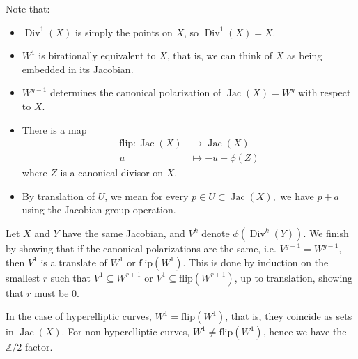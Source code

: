 \documentclass[12pt,reqno]{amsart}
\DeclareMathOperator{\Jac}{Jac}
\DeclareMathOperator{\Div}{Div}
\newcommand{\Z}{\mathbb{Z}}
\theoremstyle{definition}
\theoremstyle{remark}
\newcommand{\ti}{\todo[inline]}
\begin{document}

Note that: 

\begin{itemize} 
\item $\Div^1(X)$ is simply the points on $X$, so  $\Div^1(X) = X$.

\item $W^1$ is birationally equivalent to $X$, that is, we can think of $X$ as being embedded in its Jacobian. 

\item  $W^{g-1}$ determines the canonical polarization of $\Jac(X) = W^g$ with respect to $X$.  

\item There is a map \begin{align*}
\text{flip}: \Jac(X) &\to \Jac(X)\\
u &\mapsto -u + \phi(Z)
\end{align*}
where $Z$ is a canonical divisor on $X$.
\item By translation of $U$, we mean for every $p \in U \subset \Jac(X),$ we have $p+a$ using the Jacobian group operation.
\end{itemize} 

Let $X$ and $Y$ have the same Jacobian, and $V^{k}$ denote $\phi(\Div^k(Y))$. We finish by showing that if the canonical polarizations are the same, i.e. $V^{g-1} = W^{g-1}$, then $V^1$ is a translate of $W^1$ or $\text{flip}(W^1)$. This is done by induction on the smallest $r$ such that $V^1 \subseteq W^{r+1}$ or $V^1 \subseteq \text{flip}(W^{r+1})$, up to translation, showing that $r$ must be 0.


 In the case of hyperelliptic curves, $W^1 = \text{flip}(W^1)$, that is, they coincide as sets in $\Jac(X)$. For non-hyperelliptic curves, $W^1 \neq \text{flip}(W^1)$, hence we have the $\Z/2$ factor. 




\end{document}
